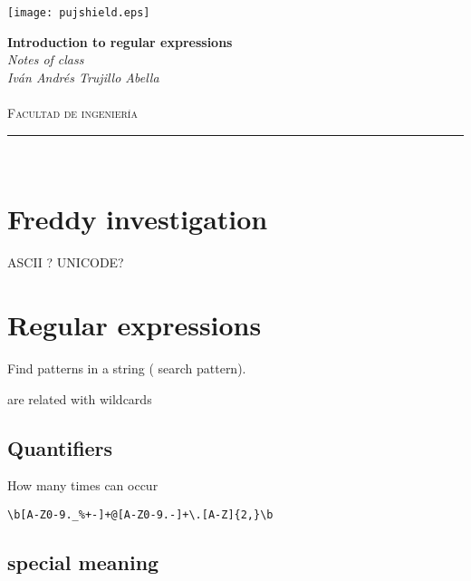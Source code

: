\documentclass[10pt,a4paper]{article}
\author{Iván Andrés Trujillo }
\begin{document}
\newcommand{\HRule}{\rule{\linewidth}{0.5mm}}


\texttt{[image: pujshield.eps]}\\[0.5cm] 

\begin{center} 
\textbf{\LARGE Introduction to regular expressions}\\[0.2cm]
\emph{\LARGE Notes of class}\\[0.3cm] 
\emph{Iván Andrés Trujillo Abella} \\
\textsc{\Large 
}\\[0.2cm] 
\textsc{\large Facultad de ingeniería}\\[0.5cm] 
\HRule \\[0.4cm]
\end{center}
\vspace{1cm}


\section{Freddy investigation}
ASCII ?
UNICODE?




\section{Regular expressions}
Find patterns in a string ( search pattern).

are related with wildcards



\subsection{Quantifiers}

How many times can occur 




\begin{verbatim}
\b[A-Z0-9._%+-]+@[A-Z0-9.-]+\.[A-Z]{2,}\b
\end{verbatim}


\begin{comment}
thereof: del mismo.
sparingly:escasamente
collides: 
comes down:
stumbled:
\end{comment}


\subsection{special meaning}
\end{document}
